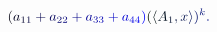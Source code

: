 \documentclass[12pt]{article}
\begin{document}
\makeatletter
\renewcommand*{\@textcolor}[3]{%
  \protect\leavevmode
  \begingroup
    \color#1{#2}#3%
  \endgroup
}
\makeatother
\begin{displaymath}
\mathcolor[RGB]{0,0,15}{(} \mathcolor[RGB]{0,0,30}{a} _ { \mathcolor[RGB]{0,0,45}{1} \mathcolor[RGB]{0,0,60}{1} } \mathcolor[RGB]{0,0,75}{+} \mathcolor[RGB]{0,0,90}{a} _ { \mathcolor[RGB]{0,0,105}{2} \mathcolor[RGB]{0,0,120}{2} } \mathcolor[RGB]{0,0,135}{+} \mathcolor[RGB]{0,0,150}{a} _ { \mathcolor[RGB]{0,0,165}{3} \mathcolor[RGB]{0,0,180}{3} } \mathcolor[RGB]{0,0,195}{+} \mathcolor[RGB]{0,0,210}{a} _ { \mathcolor[RGB]{0,0,225}{4} \mathcolor[RGB]{0,0,240}{4} } \mathcolor[RGB]{0,0,255}{)} \mathcolor[RGB]{0,15,0}{(} \mathcolor[RGB]{0,15,15}{\langle} \mathcolor[RGB]{0,15,30}{A} _ { \mathcolor[RGB]{0,15,45}{1} } \mathcolor[RGB]{0,15,60}{,} \mathcolor[RGB]{0,15,75}{x} \mathcolor[RGB]{0,15,90}{\rangle} \mathcolor[RGB]{0,15,105}{)} ^ { \mathcolor[RGB]{0,15,120}{k} } \mathcolor[RGB]{0,15,135}{.}
\end{displaymath}
\end{document}
